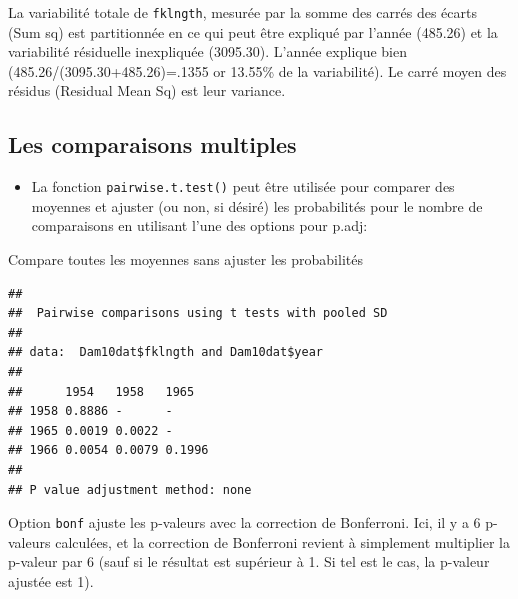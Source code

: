 \documentclass[12pt,]{book}
\newenvironment{Shaded}{\begin{snugshade}}{\end{snugshade}}
\newcommand{\DataTypeTok}[1]{\textcolor[rgb]{0.27,0.27,0.27}{#1}}
\newcommand{\KeywordTok}[1]{\textcolor[rgb]{0.27,0.27,0.27}{\textbf{#1}}}
\newcommand{\NormalTok}[1]{#1}
\newcommand{\OperatorTok}[1]{\textcolor[rgb]{0.43,0.43,0.43}{\textbf{#1}}}
\newcommand{\StringTok}[1]{\textcolor[rgb]{0.5,0.5,0.5}{#1}}
\providecommand{\tightlist}{%
  \setlength{\itemsep}{0pt}\setlength{\parskip}{0pt}}
\begin{document}
La variabilité totale de \texttt{fklngth}, mesurée par la somme des carrés des écarts (Sum sq) est partitionnée en ce qui peut être expliqué par l'année (485.26) et la variabilité résiduelle inexpliquée (3095.30). L'année explique bien (485.26/(3095.30+485.26)=.1355 or 13.55\% de la variabilité). Le carré moyen des résidus (Residual Mean Sq) est leur variance.

\hypertarget{les-comparaisons-multiples}{%
\subsection{Les comparaisons multiples}\label{les-comparaisons-multiples}}

\begin{itemize}
\tightlist
\item
  La fonction \texttt{pairwise.t.test()} peut être utilisée pour comparer des moyennes et ajuster (ou non, si désiré) les probabilités pour le nombre de comparaisons en utilisant l'une des options pour p.adj:
\end{itemize}

Compare toutes les moyennes sans ajuster les probabilités

\begin{Shaded}
\end{Shaded}

\begin{verbatim}
## 
## 	Pairwise comparisons using t tests with pooled SD 
## 
## data:  Dam10dat$fklngth and Dam10dat$year 
## 
##      1954   1958   1965  
## 1958 0.8886 -      -     
## 1965 0.0019 0.0022 -     
## 1966 0.0054 0.0079 0.1996
## 
## P value adjustment method: none
\end{verbatim}

Option \texttt{bonf} ajuste les p-valeurs avec la correction de Bonferroni. Ici, il y a 6 p-valeurs calculées, et la correction de Bonferroni revient à simplement multiplier la p-valeur par 6 (sauf si le résultat est supérieur à 1. Si tel est le cas, la p-valeur ajustée est 1).

\begin{Shaded}
\end{Shaded}
\end{document}
